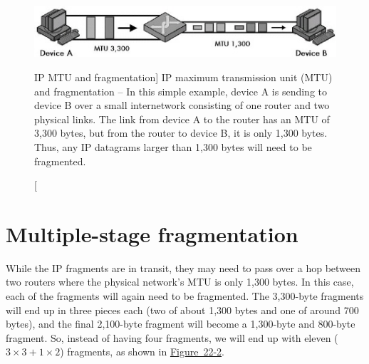 \begin{figure}
   \centering
   \includegraphics[width=.7\textwidth]{images/mtu-fragmentation.jpg}
   \caption
      [IP MTU and fragmentation]
      {IP maximum transmission unit (MTU) and fragmentation --
      In this simple example, device A is sending to device B over a small internetwork consisting of one router and two physical links.
      The link from device A to the router has an MTU of 3,300 bytes, but from the router to device B, it is only 1,300 bytes.
      Thus, any IP datagrams larger than 1,300 bytes will need to be fragmented.}
   \label{fig:mtu-fragmentation}
\end{figure}



\section{Multiple-stage fragmentation}

While the IP fragments are in transit, they may need to pass over a hop between two routers where the physical network's MTU is only 1,300 bytes.
In this case, each of the fragments will again need to be fragmented.
The 3,300-byte fragments will end up in three pieces each (two of about 1,300 bytes and one of around 700 bytes), and the final 2,100-byte
fragment will become a 1,300-byte and 800-byte fragment.
So, instead of having four fragments, we will end up with eleven ($3\times 3+1\times 2$) fragments,
as shown in \protect\hyperlink{ch22.htmlux5cux23ipv4_datagram_fragmentation_this_example}{Figure~22-2}.


